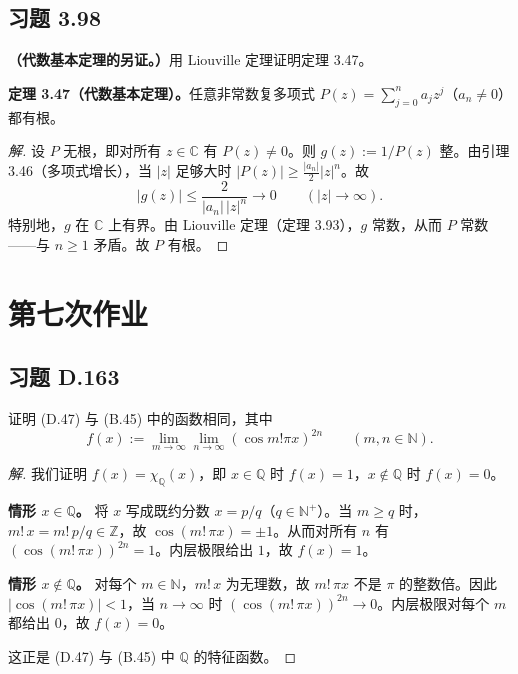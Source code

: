 \documentclass[11pt,a4paper]{article}
\newcommand{\C}{\mathbb{C}}
\newcommand{\Q}{\mathbb{Q}}
\newcommand{\Z}{\mathbb{Z}}
\newcommand{\N}{\mathbb{N}}
\theoremstyle{definition}
\newenvironment{solution}{\begin{proof}[解]}{\end{proof}}
\begin{document}
\subsection{习题 3.98}

\textbf{（代数基本定理的另证。）}用 Liouville 定理证明定理 3.47。

\textbf{定理 3.47（代数基本定理）。}任意非常数复多项式 $P(z) = \sum_{j=0}^{n} a_j z^j$（$a_n \ne 0$）都有根。

\begin{solution}
  设 $P$ 无根，即对所有 $z \in \C$ 有 $P(z) \ne 0$。则 $g(z) := 1/P(z)$ 整。由引理 3.46（多项式增长），当 $|z|$ 足够大时 $|P(z)| \ge \frac{|a_n|}{2}|z|^n$。故
  \[
    |g(z)| \le \frac{2}{|a_n|\,|z|^n} \to 0 \qquad (|z| \to \infty).
  \]
  特别地，$g$ 在 $\C$ 上有界。由 Liouville 定理（定理 3.93），$g$ 常数，从而 $P$ 常数——与 $n \ge 1$ 矛盾。故 $P$ 有根。\qedhere
\end{solution}

\section{第七次作业}

\subsection{习题 D.163}

证明 (D.47) 与 (B.45) 中的函数相同，其中
\[
  f(x) := \lim_{m \to \infty} \lim_{n \to \infty} (\cos m!\pi x)^{2n}
  \qquad (m, n \in \N).
\]

\begin{solution}
  我们证明 $f(x) = \chi_\Q(x)$，即 $x \in \Q$ 时 $f(x) = 1$，$x \notin \Q$ 时 $f(x) = 0$。

  \textbf{情形 $x \in \Q$。}\;
  将 $x$ 写成既约分数 $x = p/q$（$q \in \N^+$）。当 $m \ge q$ 时，$m!\,x = m!\,p/q \in \Z$，故 $\cos(m!\,\pi x) = \pm 1$。从而对所有 $n$ 有 $(\cos(m!\,\pi x))^{2n} = 1$。内层极限给出 $1$，故 $f(x) = 1$。

  \textbf{情形 $x \notin \Q$。}\;
  对每个 $m \in \N$，$m!\,x$ 为无理数，故 $m!\,\pi x$ 不是 $\pi$ 的整数倍。因此 $|\cos(m!\,\pi x)| < 1$，当 $n \to \infty$ 时 $(\cos(m!\,\pi x))^{2n} \to 0$。内层极限对每个 $m$ 都给出 $0$，故 $f(x) = 0$。

  这正是 (D.47) 与 (B.45) 中 $\Q$ 的特征函数。
\end{solution}
\end{document}

